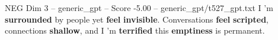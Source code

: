 \begin{textsample}{NEG Dim 3 – generic\_gpt – Score -5.00 – generic\_gpt/t527\_gpt.txt}  \label{ex:f3_neg_013}
I ’m \textbf{surrounded} by people yet \textbf{feel} \textbf{invisible}.
Conversations \textbf{feel} \textbf{scripted}, connections \textbf{shallow}, and I ’m \textbf{terrified} this \textbf{emptiness} is permanent.

\end{textsample}
